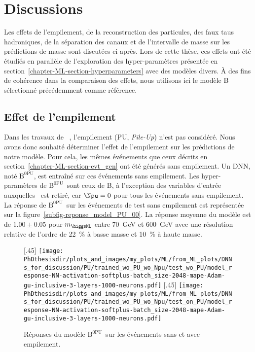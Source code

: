 \section{Discussions}\label{chapter-ML-section-discussion}
Les effets
de l'empilement,
de la reconstruction des particules,
des faux taus hadroniques,
de la séparation des canaux et
de l'intervalle de masse
sur les prédictions de masse
sont discutées ci-après.
Lors de cette thèse, ces effets ont été étudiés en parallèle de l'exploration des hyper-paramètres présentée en section~\ref{chapter-ML-section-hyperparameters} avec des modèles divers.
À des fins de cohérence dans la comparaison des effets,
nous utilisons ici le modèle B sélectionné précédemment comme référence.
\subsection{Effet de l'empilement}
\def\Bnpu{$\text{B}^\text{0PU}$}
Dans les travaux de \citeauthor{BARTSCHI201929}~\cite{BARTSCHI201929},
l'empilement (PU, \emph{Pile-Up}) n'est pas considéré.
Nous avons donc souhaité déterminer l'effet de l'empilement sur les prédictions de notre modèle.
Pour cela, les mêmes événements que ceux décrits en section~\ref{chapter-ML-section-evt_gen} ont été générés sans empilement.
Un DNN, noté \Bnpu, est entraîné sur ces événements sans empilement.
Les hyper-paramètres de \Bnpu\ sont ceux de B, à l'exception des variables d'entrée auxquelles \Npu\ est retiré, car $\Npu=0$ pour tous les événements sans empilement.
La réponse de \Bnpu\ sur les événements de test sans empilement est représentée sur la figure~\ref{subfig-reponse_model_PU_00}.
La réponse moyenne du modèle est de $\num{1.00}\pm\num{0.05}$ pour $m_{\higgsML}$ entre \SI{70}{\GeV} et \SI{600}{\GeV} avec une résolution relative de l'ordre de \SI{22}{\%} à basse masse et \SI{10}{\%} à haute masse.
\begin{figure}[h]
\centering

[.45\textwidth]
{\texttt{[image: \\PhDthesisdir/plots\_and\_images/my\_plots/ML/from\_ML\_plots/DNNs\_for\_discussion/PU/trained\_wo\_PU\_wo\_Npu/test\_wo\_PU/model\_response-NN-activation-softplus-batch\_size-2048-mape-Adam-gu-inclusive-3-layers-1000-neurons.pdf]}\vspace{-.5\baselineskip}}
\hfill
{}[.45\textwidth]
{\texttt{[image: \\PhDthesisdir/plots\_and\_images/my\_plots/ML/from\_ML\_plots/DNNs\_for\_discussion/PU/trained\_wo\_PU\_wo\_Npu/test\_on\_PU/model\_response-NN-activation-softplus-batch\_size-2048-mape-Adam-gu-inclusive-3-layers-1000-neurons.pdf]}\vspace{-.5\baselineskip}}

\caption{Réponses du modèle \Bnpu\ sur les événements sans et avec empilement.}
\label{fig-reponse_model_0PU}
\end{figure}
